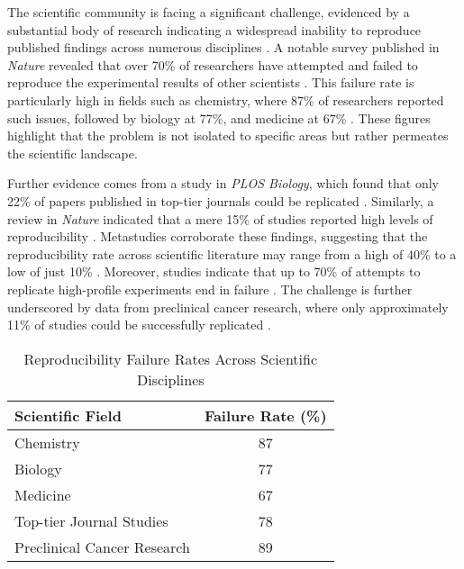 \documentclass{article}
\begin{document}
The scientific community is facing a significant challenge, evidenced by a substantial body of research indicating a widespread inability to reproduce published findings across numerous disciplines \cite{ioannidis2005most}. A notable survey published in \textit{Nature} revealed that over 70\% of researchers have attempted and failed to reproduce the experimental results of other scientists \cite{baker2016reproducibility}. This failure rate is particularly high in fields such as chemistry, where 87\% of researchers reported such issues, followed by biology at 77\%, and medicine at 67\% \cite{fanelli2018opinion}. These figures highlight that the problem is not isolated to specific areas but rather permeates the scientific landscape.

Further evidence comes from a study in \textit{PLOS Biology}, which found that only 22\% of papers published in top-tier journals could be replicated \cite{button2013power}. Similarly, a review in \textit{Nature} indicated that a mere 15\% of studies reported high levels of reproducibility \cite{baker2016reproducibility}. Metastudies corroborate these findings, suggesting that the reproducibility rate across scientific literature may range from a high of 40\% to a low of just 10\% \cite{ioannidis2014replication}. Moreover, studies indicate that up to 70\% of attempts to replicate high-profile experiments end in failure \cite{open2015estimating}. The challenge is further underscored by data from preclinical cancer research, where only approximately 11\% of studies could be successfully replicated \cite{begley2012drug}.

\begin{table}[h]
    \centering
    \caption{Reproducibility Failure Rates Across Scientific Disciplines}
    \begin{tabular}{|l|c|}
        \hline
        \textbf{Scientific Field}   & \textbf{Failure Rate (\%)} \\
        \hline
        Chemistry                   & 87                         \\
        Biology                     & 77                         \\
        Medicine                    & 67                         \\
        Top-tier Journal Studies    & 78                         \\
        Preclinical Cancer Research & 89                         \\
        \hline
    \end{tabular}
    \label{tab:reproducibility}
\end{table}
\end{document}
